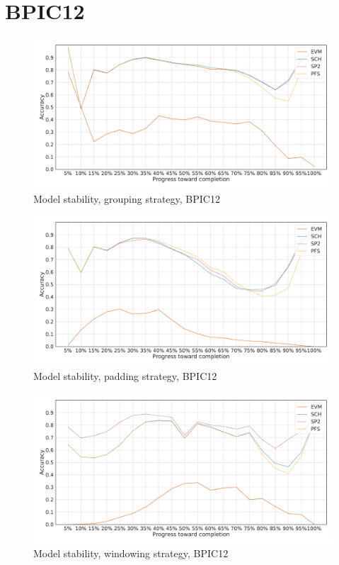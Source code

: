 \section*{BPIC12}\label{appendix:stability:bpic2012}
\begin{figure}[!htb]
    \centering
    \includegraphics[width=\textwidth]{gfx/bpic2012/grouped_stability.pdf}
    \caption{Model stability, grouping strategy, BPIC12}
    \label{fig:bpic12-grouped-stability}
\end{figure}
\begin{figure}[!htb]
    \centering
    \includegraphics[width=\textwidth]{gfx/bpic2012/padded_stability.pdf}
    \caption{Model stability, padding strategy, BPIC12}
    \label{fig:bpic12-padded-stability}
\end{figure}
\begin{figure}[!htb]
    \centering
    \includegraphics[width=\textwidth]{gfx/bpic2012/windowed_stability.pdf}
    \caption{Model stability, windowing strategy, BPIC12}
    \label{fig:bpic12-windowed-stability}
\end{figure}
\FloatBarrier

